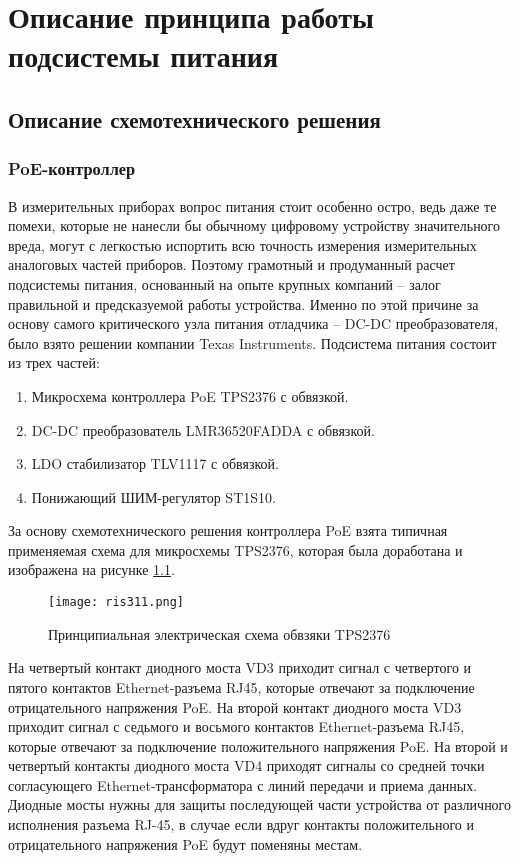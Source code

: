 \chapter{Описание принципа работы подсистемы питания}
\section{Описание схемотехнического решения}
\subsection{PoE-контроллер}
\hspace{1cm} 

В измерительных приборах вопрос питания стоит особенно остро, ведь даже те помехи, которые 
не нанесли бы обычному цифровому устройству значительного вреда, могут с легкостью испортить
всю точность измерения измерительных аналоговых частей приборов. Поэтому грамотный и продуманный расчет 
подсистемы питания, основанный на опыте крупных компаний -- залог правильной и предсказуемой работы устройства.
Именно по этой причине за основу самого критического узла питания отладчика -- DC-DC преобразователя,
было взято решении компании Texas Instruments.
Подсистема питания состоит из трех частей:

\begin{enumerate}
    \item Микросхема контроллера PoE TPS2376 с обвязкой.
    \item DC-DC преобразователь LMR36520FADDA с обвязкой.
    \item LDO стабилизатор TLV1117 с обвязкой.
    \item Понижающий ШИМ-регулятор  ST1S10.
\end{enumerate}

За основу схемотехнического решения контроллера PoE взята типичная применяемая схема для
микросхемы TPS2376, которая была доработана и изображена на рисунке \ref{ris:311}.

\begin{figure}[H]
    \centering
    \texttt{[image: ris311.png]}
    \caption{Принципиальная электрическая схема обвзяки TPS2376 }
    \label{ris:311}
\end{figure}

На четвертый контакт диодного моста VD3 приходит сигнал с четвертого и пятого контактов 
Ethernet-разъема RJ45, которые отвечают за подключение отрицательного напряжения PoE.
На второй контакт диодного моста VD3 приходит сигнал с седьмого и восьмого контактов 
Ethernet-разъема RJ45, которые отвечают за подключение положительного напряжения PoE.  
На второй и четвертый контакты диодного моста VD4 приходят сигналы со средней точки согласующего
Ethernet-трансформатора с линий передачи и приема данных. Диодные мосты нужны для защиты последующей 
части устройства от различного исполнения разъема RJ-45, в случае если вдруг контакты положительного 
и отрицательного напряжения PoE будут поменяны местам.

